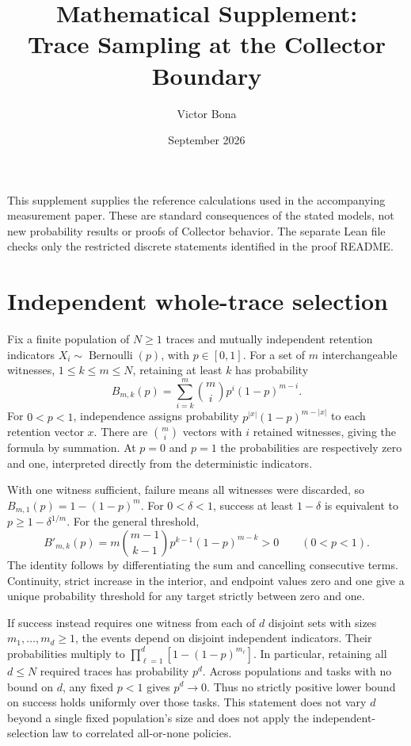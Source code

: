 \documentclass[11pt]{article}
\title{Mathematical Supplement:\\Trace Sampling at the Collector Boundary}
\author{Victor Bona}
\date{September 2026}
\begin{document}
\maketitle
\noindent This supplement supplies the reference calculations used in the accompanying measurement paper. These are standard consequences of the stated models, not new probability results or proofs of Collector behavior. The separate Lean file checks only the restricted discrete statements identified in the proof README.

\section{Independent whole-trace selection}
Fix a finite population of $N\ge1$ traces and mutually independent retention indicators $X_i\sim\operatorname{Bernoulli}(p)$, with $p\in[0,1]$. For a set of $m$ interchangeable witnesses, $1\le k\le m\le N$, retaining at least $k$ has probability
\begin{equation}\label{eq:binomial}
B_{m,k}(p)=\sum_{i=k}^{m}\binom mi p^i(1-p)^{m-i}.
\end{equation}
For $0<p<1$, independence assigns probability $p^{|x|}(1-p)^{m-|x|}$ to each retention vector $x$. There are $\binom mi$ vectors with $i$ retained witnesses, giving the formula by summation. At $p=0$ and $p=1$ the probabilities are respectively zero and one, interpreted directly from the deterministic indicators.

With one witness sufficient, failure means all witnesses were discarded, so $B_{m,1}(p)=1-(1-p)^m$. For $0<\delta<1$, success at least $1-\delta$ is equivalent to $p\ge1-\delta^{1/m}$. For the general threshold,
\[
B'_{m,k}(p)=m\binom{m-1}{k-1}p^{k-1}(1-p)^{m-k}>0\qquad(0<p<1).
\]
The identity follows by differentiating the sum and cancelling consecutive terms. Continuity, strict increase in the interior, and endpoint values zero and one give a unique probability threshold for any target strictly between zero and one.

If success instead requires one witness from each of $d$ disjoint sets with sizes $m_1,\ldots,m_d\ge1$, the events depend on disjoint independent indicators. Their probabilities multiply to $\prod_{\ell=1}^{d}[1-(1-p)^{m_\ell}]$. In particular, retaining all $d\le N$ required traces has probability $p^d$. Across populations and tasks with no bound on $d$, any fixed $p<1$ gives $p^d\to0$. Thus no strictly positive lower bound on success holds uniformly over those tasks. This statement does not vary $d$ beyond a single fixed population's size and does not apply the independent-selection law to correlated all-or-none policies.
\end{document}
